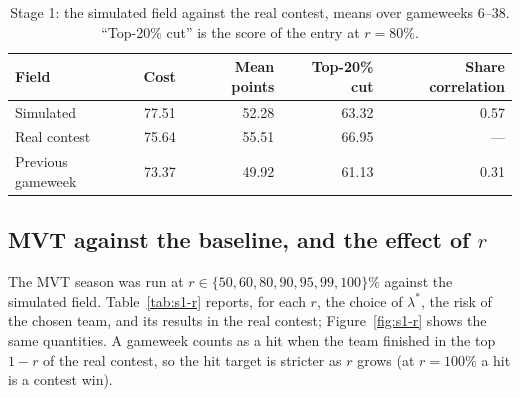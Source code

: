 \begin{table}[ht]
  \centering
  \caption{Stage 1: the simulated field against the real contest, means over gameweeks 6--38.
  ``Top-20\% cut'' is the score of the entry at $r=80\%$.}
  \label{tab:s1-field}
  \begin{tabular}{lrrrr}
    \toprule
    Field & Cost & Mean points & Top-20\% cut & Share correlation \\
    \midrule
    Simulated           & 77.51 & 52.28 & 63.32 & 0.57 \\
    Real contest        & 75.64 & 55.51 & 66.95 & --- \\
    Previous gameweek   & 73.37 & 49.92 & 61.13 & 0.31 \\
    \bottomrule
  \end{tabular}
\end{table}

\subsection{MVT against the baseline, and the effect of $r$}
\label{sec:s1-results}

The MVT season was run at $r\in\{50,60,80,90,95,99,100\}\%$ against the simulated field.
Table~\ref{tab:s1-r} reports, for each $r$, the choice of $\lambda^*$, the risk of the chosen
team, and its results in the real contest; Figure~\ref{fig:s1-r} shows the same quantities.
A gameweek counts as a hit when the team finished in the top $1-r$ of the real contest, so the
hit target is stricter as $r$ grows (at $r=100\%$ a hit is a contest win).

